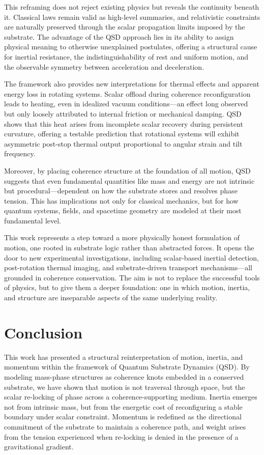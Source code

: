 \documentclass[entropy,article,submit,pdftex,moreauthors]{Definitions/mdpi}
\begin{document}
This reframing does not reject existing physics but reveals the continuity beneath it. Classical laws remain valid as high-level summaries, and relativistic constraints are naturally preserved through the scalar propagation limits imposed by the substrate. The advantage of the QSD approach lies in its ability to assign physical meaning to otherwise unexplained postulates, offering a structural cause for inertial resistance, the indistinguishability of rest and uniform motion, and the observable symmetry between acceleration and deceleration.

The framework also provides new interpretations for thermal effects and apparent energy loss in rotating systems. Scalar offload during coherence reconfiguration leads to heating, even in idealized vacuum conditions—an effect long observed but only loosely attributed to internal friction or mechanical damping. QSD shows that this heat arises from incomplete scalar recovery during persistent curvature, offering a testable prediction that rotational systems will exhibit asymmetric post-stop thermal output proportional to angular strain and tilt frequency.

Moreover, by placing coherence structure at the foundation of all motion, QSD suggests that even fundamental quantities like mass and energy are not intrinsic but procedural—dependent on how the substrate stores and resolves phase tension. This has implications not only for classical mechanics, but for how quantum systems, fields, and spacetime geometry are modeled at their most fundamental level.

This work represents a step toward a more physically honest formulation of motion, one rooted in substrate logic rather than abstracted forces. It opens the door to new experimental investigations, including scalar-based inertial detection, post-rotation thermal imaging, and substrate-driven transport mechanisms—all grounded in coherence conservation. The aim is not to replace the successful tools of physics, but to give them a deeper foundation: one in which motion, inertia, and structure are inseparable aspects of the same underlying reality.

\section{Conclusion}
This work has presented a structural reinterpretation of motion, inertia, and momentum within the framework of Quantum Substrate Dynamics (QSD). By modeling mass-phase structures as coherence knots embedded in a conserved substrate, we have shown that motion is not traversal through space, but the scalar re-locking of phase across a coherence-supporting medium. Inertia emerges not from intrinsic mass, but from the energetic cost of reconfiguring a stable boundary under scalar constraint. Momentum is redefined as the directional commitment of the substrate to maintain a coherence path, and weight arises from the tension experienced when re-locking is denied in the presence of a gravitational gradient.
\end{document}
